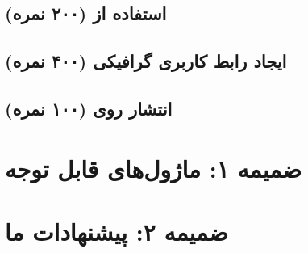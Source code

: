 \documentclass[a4paper]{report}
\begin{document}
\section{استفاده از  (۲۰۰ نمره)}


\section{ایجاد رابط کاربری گرافیکی (۴۰۰ نمره)}


\section{انتشار روی  (۱۰۰ نمره)}


\chapter{ضمیمه ۱: ماژول‌های قابل توجه}


\chapter{ضمیمه ۲: پیشنهادات ما}

\end{document}
